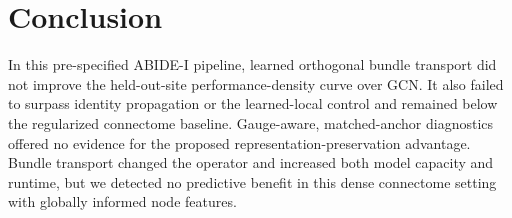 \section{Conclusion}

In this pre-specified ABIDE-I pipeline, learned orthogonal bundle transport did
not improve the held-out-site performance-density curve over GCN. It also
failed to surpass identity propagation or the learned-local control and
remained below the regularized connectome baseline. Gauge-aware,
matched-anchor diagnostics offered no evidence for the proposed
representation-preservation advantage. Bundle transport changed the operator
and increased both model capacity and runtime, but we detected no predictive
benefit in this dense connectome setting with globally informed node features.
